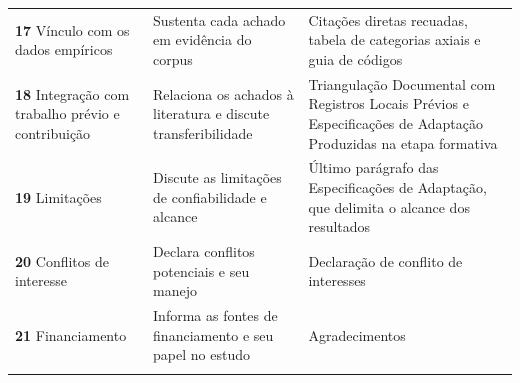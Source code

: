 {\begin{longtable}{p{3.6cm}p{4.6cm}p{5.6cm}}
\addlinespace
\textbf{17} Vínculo com os dados empíricos & Sustenta cada achado em evidência do corpus & Citações diretas recuadas, tabela de categorias axiais e guia de códigos \\
\addlinespace
\textbf{18} Integração com trabalho prévio e contribuição & Relaciona os achados à literatura e discute transferibilidade & Triangulação Documental com Registros Locais Prévios e Especificações de Adaptação Produzidas na etapa formativa \\
\addlinespace
\textbf{19} Limitações & Discute as limitações de confiabilidade e alcance & Último parágrafo das Especificações de Adaptação, que delimita o alcance dos resultados \\
\addlinespace
\textbf{20} Conflitos de interesse & Declara conflitos potenciais e seu manejo & Declaração de conflito de interesses \\
\addlinespace
\textbf{21} Financiamento & Informa as fontes de financiamento e seu papel no estudo & Agradecimentos \\
\addlinespace
\end{longtable}
}
